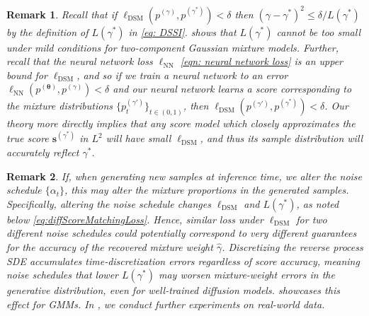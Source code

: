 \documentclass[11pt]{article}
\newcommand{\vect}[1]{\mathbf{#1}}
\theoremstyle{plain}
\newtheorem{remark}{Remark}
\newcommand{\1}{\mathbbm{1}}
\newcommand{\btheta}{{\boldsymbol{\theta}}}
\newcommand{\vx}{\vect{x}}
\newcommand{\vs}{\vect{s}}
\newcommand{\ldsm}{\ell_\mathrm{DSM}}
\newcommand{\lnn}{\ell_{\mathrm{NN}}}
\newcommand{\pdist}[2][]{p_{#1}^{(#2)}}
\newcommand{\score}[2][]{\vect{s}_{#1}^{(#2)}}
\begin{document}
\begin{remark}
    Recall that if $\ldsm(\pdist{\gamma},\pdist{\gamma^*})<\delta$ then $(\gamma-\gamma^*)^2 \le \delta/L(\gamma^*)$ by the definition of $L(\gamma^*)$ in \eqref{eq: DSSI}.
     shows that $L(\gamma^*)$ cannot be too small under mild conditions for two-component Gaussian mixture models. 
    Further, recall that the neural network loss $\lnn$ \eqref{eqn: neural network loss} is an upper bound for $\ldsm$, and so if we train a neural network to an error $\lnn(\pdist{\btheta},\pdist{\gamma})<\delta$ and our neural network learns a score corresponding to the mixture distributions $\{\pdist[t]{\gamma'}\}_{t\in (0,1)}$, then $\ldsm(\pdist{\gamma'},\pdist{\gamma^*})<\delta$. 
    Our theory more directly implies that any score model which closely approximates the true score $\score{\gamma^*}$ in $L^2$ will have small $\ldsm$, and thus its sample distribution will accurately reflect $\gamma^*$.
\end{remark}

\begin{remark}
    If, when generating new samples at inference time, we alter the noise schedule $\{\alpha_t\}$, this may alter the mixture proportions in the generated samples. Specifically, altering the noise schedule changes $\ldsm$ and $L(\gamma^*)$, as noted below \eqref{eq:diffScoreMatchingLoss}.
    Hence, similar loss under $\ldsm$ for two different noise schedules could potentially correspond to very different guarantees for the accuracy of the recovered mixture weight $\hat\gamma$. Discretizing the reverse process SDE accumulates time-discretization errors regardless of score accuracy, meaning noise schedules that lower $L(\gamma^*)$ may worsen mixture-weight errors in the generative distribution, even for well-trained diffusion models.
     showcases this effect for GMMs. In , we conduct further experiments on real-world data. 
\end{remark}
\end{document}
